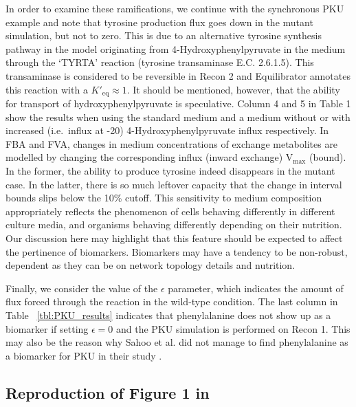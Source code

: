 \documentclass[10pt,a4paper,onecolumn]{article}
\begin{document}
In order to examine these ramifications, we continue with the
synchronous PKU example and note that tyrosine production flux goes down
in the mutant simulation, but not to zero. This is due to an alternative
tyrosine synthesis pathway in the model originating from
4-Hydroxyphenylpyruvate in the medium through the `TYRTA' reaction
(tyrosine transaminase E.C. 2.6.1.5). This transaminase is considered to
be reversible in Recon 2 and Equilibrator \autocite{Noor2012} annotates
this reaction with a \(K'_{\text{eq}} \approx 1\). It should be
mentioned, however, that the ability for transport of
hydroxyphenylpyruvate is speculative. Column 4 and 5 in Table 1 show the
results when using the standard medium and a medium without or with
increased (i.e.~influx at -20) 4-Hydroxyphenylpyruvate influx
respectively. In FBA and FVA, changes in medium concentrations of
exchange metabolites are modelled by changing the corresponding influx
(inward exchange) V\(_{\text{max}}\) (bound). In the former, the ability
to produce tyrosine indeed disappears in the mutant case. In the latter,
there is so much leftover capacity that the change in interval bounds
slips below the 10\% cutoff. This sensitivity to medium composition
appropriately reflects the phenomenon of cells behaving differently in
different culture media, and organisms behaving differently depending on
their nutrition. Our discussion here may highlight that this feature
should be expected to affect the pertinence of biomarkers. Biomarkers
may have a tendency to be non-robust, dependent as they can be on
network topology details and nutrition.

Finally, we consider the value of the \(\epsilon\) parameter, which
indicates the amount of flux forced through the reaction in the
wild-type condition. The last column in Table ~\ref{tbl:PKU_results}
indicates that phenylalanine does not show up as a biomarker if setting
\(\epsilon = 0\) and the PKU simulation is performed on Recon 1. This
may also be the reason why Sahoo et al. did not manage to find
phenylalanine as a biomarker for PKU in their study
\autocite{Sahoo2012}.

\subsection{\texorpdfstring{Reproduction of Figure 1 in
\autocite{Shlomi2009}}{Reproduction of Figure 1 in {[}@Shlomi2009{]}}}\label{reproduction-of-figure-1-in-shlomi2009}
\end{document}
